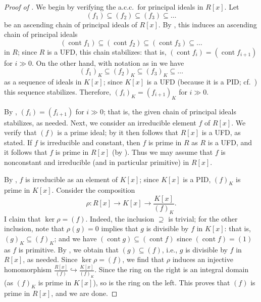 \begin{proof}[Proof of ]
  We begin by verifying the a.c.c.\ for principal ideals in
  $R[x]$. Let
  \[(f_1) \subseteq (f_2) \subseteq (f_3) \subseteq \dots\] be an
  ascending chain of principal ideals of $R[x]$. By
  , this induces an ascending chain of principal
  ideals
  \[(\operatorname{cont} f_1) \subseteq (\operatorname{cont} f_2)
    \subseteq (\operatorname{cont} f_3) \subseteq \dots\] in $R$;
  since $R$ is a UFD, this chain stabilizes: that is,
  $(\operatorname{cont} f_i) = (\operatorname{cont} f_{i+1})$ for
  $i \gg 0$. On the other hand, with notation as in
   we have
  \[(f_1)_K \subseteq (f_2)_K \subseteq (f_3)_K \subseteq \dots\] as a
  sequence of ideals in $K[x]$; since $K[x]$ is a UFD (because it is a
  PID; cf.\ ) this sequence
  stabilizes. Therefore, $(f_i)_K = (f_{i+1})_K$ for $i \gg 0$.

  By , $(f_i) = (f_{i+1})$ for $i \gg 0$; that
  is, the given chain of principal ideals stabilizes, as needed.
  Next, we consider an irreducible element $f$ of $R[x]$. We verify
  that $(f)$ is a prime ideal; by  it then follows
  that $R[x]$ is a UFD, as stated. If $f$ is irreducible and constant,
  then $f$ is prime in $R$ as $R$ is a UFD, and it follows that $f$ is
  prime in $R[x]$ (by ). Thus we may assume that
  $f$ is nonconstant and irreducible (and in particular primitive) in
  $R[x]$.

  By , $f$ is irreducible as an element of
  $K[x]$; since $K[x]$ is a PID, $(f)_K$ is prime in $K[x]$. Consider
  the composition
  \[\rho : R[x] \to K[x] \to \frac{K[x]}{(f)_K}.\]
  I claim that $\ker \rho = (f)$. Indeed, the inclusion $\supseteq$ is
  trivial; for the other inclusion, note that $\rho(g) = 0$ implies
  that $g$ is divisible by $f$ in $K[x]$: that is,
  $(g)_K \subseteq (f)_K$; and we have
  $(\operatorname{cont} g) \subseteq (\operatorname{cont} f)$ since
  $(\operatorname{cont} f) = (1)$ as $f$ is primitive. By
  , we obtain that $(g) \subseteq (f)$, i.e., $g$
  is divisible by $f$ in $R[x]$, as needed. Since $\ker \rho = (f)$,
  we find that $\rho$ induces an injective homomorphism
  $\frac{R[x]}{(f)} \hookrightarrow \frac{K[x]}{(f)_K}$.  Since the
  ring on the right is an integral domain (as $(f)_K$ is prime in
  $K[x]$), so is the ring on the left. This proves that $(f)$ is prime
  in $R[x]$, and we are done.
\end{proof}
